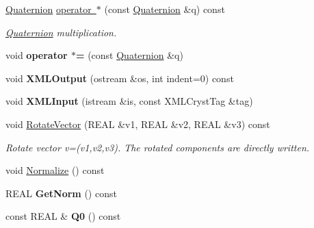 \begin{DoxyCompactItemize}
\mbox{\hyperlink{class_obj_cryst_1_1_quaternion}{Quaternion}} \mbox{\hyperlink{class_obj_cryst_1_1_quaternion_a1180ded333fb5c84481bb0b92fbdcc03}{operator $\ast$}} (const \mbox{\hyperlink{class_obj_cryst_1_1_quaternion}{Quaternion}} \&q) const
\begin{DoxyCompactList}\small\item\em \mbox{\hyperlink{class_obj_cryst_1_1_quaternion}{Quaternion}} multiplication. \end{DoxyCompactList}\item 
\mbox{\label{class_obj_cryst_1_1_quaternion_ae2e0eaec1e0f9ef358092ba800670b23}} 
void {\bfseries operator $\ast$=} (const \mbox{\hyperlink{class_obj_cryst_1_1_quaternion}{Quaternion}} \&q)
\item 
\mbox{\label{class_obj_cryst_1_1_quaternion_a4e802ce8287b8f5cabafda4d8c00e4f9}} 
void {\bfseries X\+M\+L\+Output} (ostream \&os, int indent=0) const
\item 
\mbox{\label{class_obj_cryst_1_1_quaternion_afea1afc8fed0f18668374b7e7bd11dce}} 
void {\bfseries X\+M\+L\+Input} (istream \&is, const X\+M\+L\+Cryst\+Tag \&tag)
\item 
\mbox{\label{class_obj_cryst_1_1_quaternion_af8c6c41e1af3f0f0f1031dc3fe936254}} 
void \mbox{\hyperlink{class_obj_cryst_1_1_quaternion_af8c6c41e1af3f0f0f1031dc3fe936254}{Rotate\+Vector}} (R\+E\+AL \&v1, R\+E\+AL \&v2, R\+E\+AL \&v3) const
\begin{DoxyCompactList}\small\item\em Rotate vector v=(v1,v2,v3). The rotated components are directly written. \end{DoxyCompactList}\item 
void \mbox{\hyperlink{class_obj_cryst_1_1_quaternion_ac5a0461b9a89ce473a4d2c0dac73840d}{Normalize}} () const
\item 
\mbox{\label{class_obj_cryst_1_1_quaternion_a8248f6e693549825402c31f4be0018df}} 
R\+E\+AL {\bfseries Get\+Norm} () const
\item 
\mbox{\label{class_obj_cryst_1_1_quaternion_a0aa7cc81ffacd7e90d80592a24002659}} 
const R\+E\+AL \& {\bfseries Q0} () const

\end{DoxyCompactItemize}
